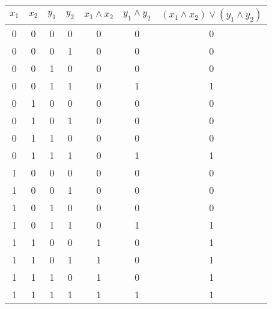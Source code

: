 \documentclass[a4paper,10pt]{article}
\begin{document}
\begin{center}
 
\begin{tabular}{|c|c|c|c|c|c|c|}
\hline
$x_1$ & $x_2$ & $y_1$ & $y_2$ & $x_1 \wedge x_2 $ & $y_1 \wedge y_2$ & $(x_1 \wedge x_2) \vee (y_1 \wedge y_2)$ \\
\hline
0 & 0 & 0 & 0 & 0 & 0 & 0 \\
0 & 0 & 0 & 1 & 0 & 0 & 0 \\
0 & 0 & 1 & 0 & 0 & 0 & 0 \\
0 & 0 & 1 & 1 & 0 & 1 & 1 \\
0 & 1 & 0 & 0 & 0 & 0 & 0 \\
0 & 1 & 0 & 1 & 0 & 0 & 0 \\
0 & 1 & 1 & 0 & 0 & 0 & 0 \\
0 & 1 & 1 & 1 & 0 & 1 & 1 \\
1 & 0 & 0 & 0 & 0 & 0 & 0 \\
1 & 0 & 0 & 1 & 0 & 0 & 0 \\
1 & 0 & 1 & 0 & 0 & 0 & 0 \\
1 & 0 & 1 & 1 & 0 & 1 & 1 \\
1 & 1 & 0 & 0 & 1 & 0 & 1 \\
1 & 1 & 0 & 1 & 1 & 0 & 1 \\
1 & 1 & 1 & 0 & 1 & 0 & 1 \\
1 & 1 & 1 & 1 & 1 & 1 & 1 \\

\hline
\end{tabular}

\end{center}
\end{document}
